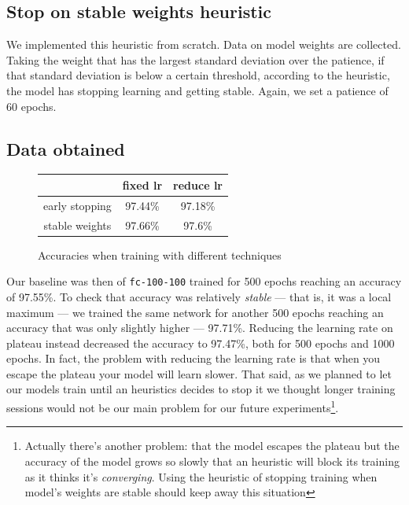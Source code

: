\subsection{Stop on stable weights heuristic}
We implemented this heuristic from scratch. Data on model weights are
collected. Taking the weight that has the largest standard deviation
over the patience, if that standard deviation is below a certain
threshold, according to the heuristic, the model has stopping learning
and getting stable. Again, we set a patience of 60 epochs.

\subsection{Data obtained}

\begin{figure}
  \centering
  \begin{tabular}{|c|c|c|}
    \hline
    & fixed lr & reduce lr \\
    \hline
    early stopping & 97.44\% & 97.18\% \\
    \hline
    stable weights & 97.66\% & 97.6\% \\
    \hline
  \end{tabular}
  \caption{Accuracies when training with different techniques}
  \label{fig:accuracy-heuristics}
\end{figure}

Our baseline was then of \texttt{fc-100-100} trained for 500 epochs
reaching an accuracy of 97.55\%. To check that accuracy was relatively
\emph{stable} --- that is, it was a local maximum --- we trained the
same network for another 500 epochs reaching an accuracy that was only
slightly higher --- 97.71\%. Reducing the learning rate on plateau
instead decreased the accuracy to 97.47\%, both for 500 epochs and 1000
epochs. In fact, the problem with reducing the learning rate is that
when you escape the plateau your model will learn slower. That said, as
we planned to let our models train until an heuristics decides to stop
it we thought longer training sessions would not be our main problem
for our future experiments\footnote{Actually there's another problem:
  that the model escapes the plateau but the accuracy of the model
  grows so slowly that an heuristic will block its training as it
  thinks it's \emph{converging}. Using the heuristic of stopping
  training when model's weights are stable should keep away this
  situation}.

